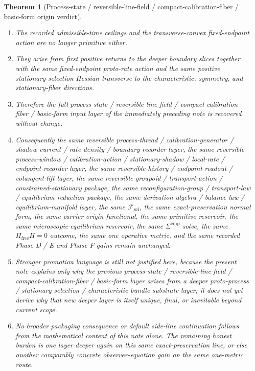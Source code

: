 \documentclass[11pt]{article}
\newcommand{\StemFunctional}{\mathscr F_{\mathrm{sel}}}
\newtheorem{theorem}{Theorem}
\begin{document}
\begin{theorem}[Process-state / reversible-line-field / compact-calibration-fiber / basic-form origin verdict]
\begin{enumerate}
    \item The recorded admissible-time ceilings and the transverse-convex fixed-endpoint action are no longer primitive either.
    \item They arise from first positive returns to the deeper boundary slices together with the same fixed-endpoint proto-rate action and the same positive stationary-selection Hessian transverse to the characteristic, symmetry, and stationary-fiber directions.
    \item Therefore the full process-state / reversible-line-field / compact-calibration-fiber / basic-form input layer of the immediately preceding note is recovered without change.
    \item Consequently the same reversible process-thread / calibration-generator / shadow-current / rate-density / boundary-recorder layer, the same reversible process-window / calibration-action / stationary-shadow / local-rate / endpoint-recorder layer, the same reversible-history / endpoint-readout / cotangent-lift layer, the same reversible-groupoid / transport-action / constrained-stationary package, the same reconfiguration-group / transport-law / equilibrium-reduction package, the same derivation-algebra / balance-law / equilibrium-manifold layer, the same \(\StemFunctional\), the same exact-preservation normal form, the same carrier-origin functional, the same primitive reservoir, the same microscopic-equilibrium reservoir, the same \(\Sigma^{\mathrm{cmp}}\) solve, the same \(\Pi_{\mathrm{free}}H=0\) outcome, the same one operative metric, and the same recorded Phase D / E and Phase F gains remain unchanged.
    \item Stronger promotion language is still not justified here, because the present note explains only why the previous process-state / reversible-line-field / compact-calibration-fiber / basic-form layer arises from a deeper proto-process / stationary-selection / characteristic-bundle substrate layer; it does not yet derive why that new deeper layer is itself unique, final, or inevitable beyond current scope.
    \item No broader packaging consequence or default side-line continuation follows from the mathematical content of this note alone. The remaining honest burden is one layer deeper again on this same exact-preservation line, or else another comparably concrete observer-equation gain on the same one-metric route.
\end{enumerate}
\end{theorem}
\end{document}
